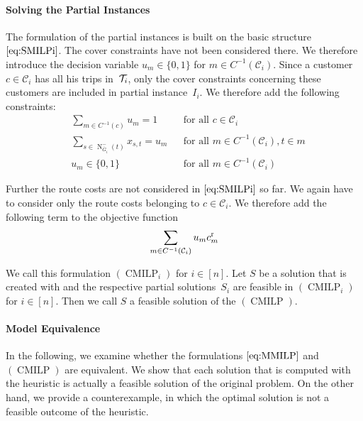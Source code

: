 \paragraph{Solving the Partial Instances} \parfill

The formulation of the partial instances is built on the basic structure $\eqref{eq:SMILPi}$. The cover constraints have not been considered there. We therefore introduce the decision variable $u_m\in\{0,1\}$ for $m\in C^{-1}\left(\mathcal{C}_i\right)$. Since a customer $c\in\mathcal{C}_i$ has all his trips in~$\mathcal{T}_i$, only the cover constraints concerning these customers are included in partial instance~$I_i$. We therefore add the following constraints:
\begin{align}
	& \sum_{m\in C^{-1}(c)} u_m = 1 && \text{for all } c\in\mathcal{C}_i \label{eq:CMILP:customer} \\
	& \sum_{s\in\operatorname{N}_{\overline{G}_i}^-(t)} x_{s,t} = u_m && \text{for all } m\in C^{-1}\left(\mathcal{C}_i\right), t\in m \label{eq:CMILP:route} \\
	& u_m\in\{0,1\} && \text{for all } m\in C^{-1}\left(\mathcal{C}_i\right) \label{eq:CMILP:um}
\end{align}

Further the route costs are not considered in $\eqref{eq:SMILPi}$ so far. We again have to consider only the route costs belonging to $c\in\mathcal{C}_i$. We therefore add the following term to the objective function
\begin{align*}
	\sum_{m\in C^{-1}\left(\mathcal{C}_i\right)} u_m c^{\operatorname{r}}_m
\end{align*}

We call this formulation $(\operatorname{CMILP}_i)$ for $i\in[n]$. Let $S$ be a solution that is created with  and the respective partial solutions~$S_i$ are feasible in $(\operatorname{CMILP}_i)$ for ${i\in[n]}$. Then we call $S$ a feasible solution of the $(\operatorname{CMILP})$.

\paragraph{Model Equivalence} \parfill

In the following, we examine whether the formulations $\eqref{eq:MMILP}$ and $(\operatorname{CMILP})$ are equivalent. We show that each solution that is computed with the heuristic is actually a feasible solution of the original problem. On the other hand, we provide a counterexample, in which the optimal solution is not a feasible outcome of the heuristic.

